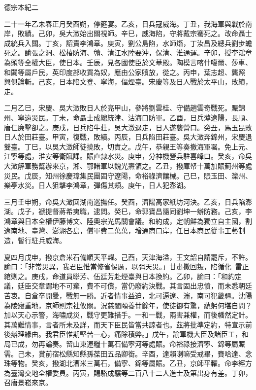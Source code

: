 
\begin{pinyinscope}
德宗本紀二

二十一年乙未春正月癸酉朔，停筵宴。乙亥，日兵寇威海。丁丑，我海軍與戰於南岸，敗績。己卯，吳大澂始出關視師。辛巳，威海陷，守將戴宗騫死之。改命聶士成統兵入關。丁亥，詔責李鴻章。庚寅，劉公島陷，水師熸，丁汝昌及總兵劉步蟾死之。諭張之洞、松椿防海、贛、清江水陸要沖，保清、淮通運。辛卯，授李鴻章為頭等全權大臣，使日本。壬辰，見各國使臣於文華殿。陶模言喀什噶爾、莎車、和闐等屬戶民，英印度部收買為奴，應由公家贖放，從之。丙申，葉志超、龔照興俱論斬。己亥，日本陷文登、寧海，偪煙臺。宋慶等及日人戰於太平山，敗績，走。

二月乙巳，宋慶、吳大澂敗日人於亮甲山，參將劉雲桂、守備趙雲奇戰死。賑錦州、寧遠災民。丁未，命聶士成總統津、沽海口防軍。乙酉，日兵薄遼陽，長順、唐仁廉擊卻之。庚戌，日兵陷牛莊，吳大澂退走，日人遂襲營口。癸丑，馬玉昆敗日人於田莊臺。甲寅，復戰，敗績。丙辰，日兵陷田莊臺。吳大澂奔錦州，宋慶退雙臺。丁巳，以吳大澂師徒撓敗，切責之。戊午，恭親王等奏撤海軍署。免上元、江寧等處，淮安等衛賦課。賑直隸水災。庚申，分神機營兵駐喜峰口。癸亥，命吳大澂解軍務幫辦來京，湘、鄂諸軍以魏光燾領之。乙丑，撥庫帑十萬加賑薊州等處災民。戊辰，知州徐慶璋集民團固守遼陽，命裕祿濟饟械。己巳，賑玉田、灤州、樂亭水災。日人狙擊李鴻章，彈傷其頰。庚午，日人犯澎湖。

三月壬申朔，命吳大澂回湖南巡撫任。癸酉，濟陽高家紙坊河決。乙亥，日兵陷澎湖。戊子，褫提督蔣希夷職，逮問。癸巳，命郭寶昌隨同劉坤一辦防務。己亥，李鴻章與日本全權伊藤博文、陸奧宗光馬關會議。和約成，定朝鮮為獨立自主國，割遼南地、臺灣、澎湖各島，償軍費二萬萬，增通商口岸，任日本商民從事工藝制造，暫行駐兵威海。

夏四月戊申，撥京倉米石備順天平糶。己酉，天津海溢，王文韶自請罷斥，不許。諭曰：「非常災異，我君臣惟當修省惕厲，以弭天災。」甘肅撒回叛，陷循化，雷正綰剿之。庚戌，命道員聯芳、伍廷芳赴煙臺與日本換約。乙卯，諭曰：「和約定議，廷臣交章謂地不可棄，費不可償，當仍廢約決戰。其言固出忠憤，而未悉朝廷苦衷。自倉卒開釁，戰無一勝。近者情事益迫，北可逼遼、瀋，南可犯畿疆。沈陽為陵寢重地，京師則宗社攸關。況慈闈頤養廿餘年，使徒御有驚，藐躬何堪自問？加以天心示警，海嘯成災，戰守更難措手。一和一戰，兩害兼權，而後幡然定計。其萬難情事，言者所未及詳，而天下臣民皆當共諒者也。茲將批準定約，特宣示前後辦理緣由。我君臣惟期堅苦一心，痛除積弊。」戊午，諭軍機大臣及諸臣工，和局已成，勿再論奏。留山東運糧十萬石備寧河等處賑。命裕祿接濟寧、錦等屬賑需。己未，賞前宿松縣知縣孫葆田五品卿銜。辛酉，達賴喇嘛受戒畢，賚哈達、念珠等物。癸亥，撥湖北漕米三萬石，備寧、錦等屬賑。乙丑，京師平糶。命李經方為臺灣交地全權委員。丙寅，賜駱成驤等二百八十二人進士及第出身有差。丁卯，召唐景崧來京。


\end{pinyinscope}
